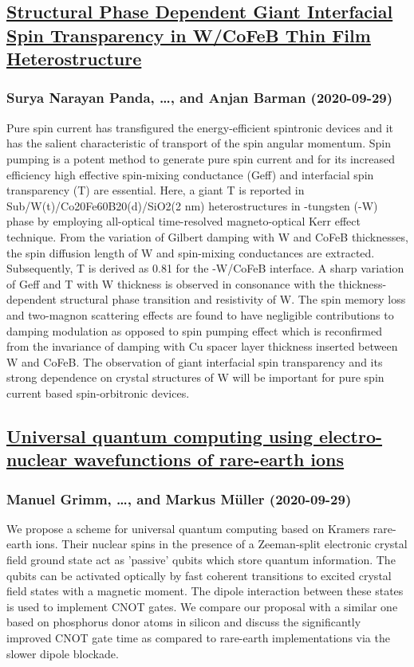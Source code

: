 \subsection*{\href{http://arxiv.org/abs/2009.14143v1}{Structural Phase Dependent Giant Interfacial Spin Transparency in  W/CoFeB Thin Film Heterostructure}}
\subsubsection*{Surya Narayan Panda, \dots, and Anjan Barman (2020-09-29)}
Pure spin current has transfigured the energy-efficient spintronic devices
and it has the salient characteristic of transport of the spin angular
momentum. Spin pumping is a potent method to generate pure spin current and for
its increased efficiency high effective spin-mixing conductance (Geff) and
interfacial spin transparency (T) are essential. Here, a giant T is reported in
Sub/W(t)/Co20Fe60B20(d)/SiO2(2 nm) heterostructures in \beta-tungsten (\beta-W)
phase by employing all-optical time-resolved magneto-optical Kerr effect
technique. From the variation of Gilbert damping with W and CoFeB thicknesses,
the spin diffusion length of W and spin-mixing conductances are extracted.
Subsequently, T is derived as 0.81  for the \beta-W/CoFeB interface. A
sharp variation of Geff and T with W thickness is observed in consonance with
the thickness-dependent structural phase transition and resistivity of W. The
spin memory loss and two-magnon scattering effects are found to have negligible
contributions to damping modulation as opposed to spin pumping effect which is
reconfirmed from the invariance of damping with Cu spacer layer thickness
inserted between W and CoFeB. The observation of giant interfacial spin
transparency and its strong dependence on crystal structures of W will be
important for pure spin current based spin-orbitronic devices.

\subsection*{\href{http://arxiv.org/abs/2009.14126v1}{Universal quantum computing using electro-nuclear wavefunctions of  rare-earth ions}}
\subsubsection*{Manuel Grimm, \dots, and Markus Müller (2020-09-29)}
We propose a scheme for universal quantum computing based on Kramers
rare-earth ions. Their nuclear spins in the presence of a Zeeman-split
electronic crystal field ground state act as 'passive' qubits which store
quantum information. The qubits can be activated optically by fast coherent
transitions to excited crystal field states with a magnetic moment. The dipole
interaction between these states is used to implement CNOT gates. We compare
our proposal with a similar one based on phosphorus donor atoms in silicon and
discuss the significantly improved CNOT gate time as compared to rare-earth
implementations via the slower dipole blockade.

